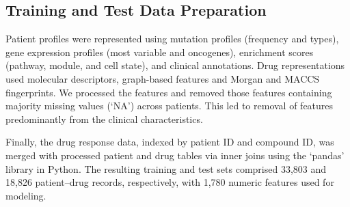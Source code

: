\documentclass[sigconf,authordraft]{acmart}
\begin{document}
\subsection{Training and Test Data Preparation}
Patient profiles were represented using mutation profiles (frequency and types), gene expression profiles (most variable and oncogenes), enrichment scores (pathway, module, and cell state), and clinical annotations. Drug representations used molecular descriptors, graph-based features and Morgan and MACCS fingerprints. We processed the features and removed those features containing majority missing values (`NA') across patients. This led to removal of features predominantly from the clinical characteristics.

Finally, the drug response data, indexed by patient ID and compound ID, was merged with processed patient and drug tables via inner joins using the `pandas' library in Python. The resulting training and test sets comprised 33,803 and 18,826 patient–drug records, respectively, with 1,780 numeric features used for modeling.
\vspace{-3mm}
\end{document}

